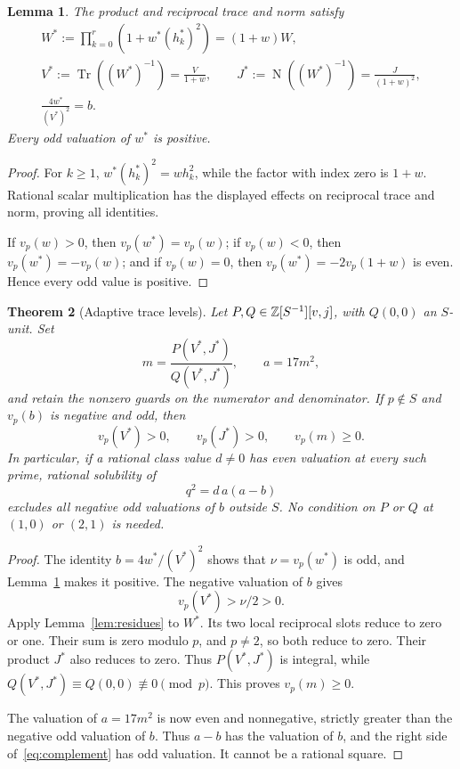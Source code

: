 \documentclass[11pt,a4paper]{article}
\newtheorem{theorem}{Theorem}[section]
\newtheorem{lemma}[theorem]{Lemma}
\theoremstyle{definition}\newtheorem{definition}[theorem]{Definition}
\DeclareMathOperator{\Tr}{Tr}\DeclareMathOperator{\Nm}{N}
\begin{document}
\begin{lemma}\label{lem:exact}
The product and reciprocal trace and norm satisfy
\begin{equation}\label{eq:staridentities}
 \begin{gathered}
 W^*:=\prod_{k=0}^{r}(1+w^*(h_k^*)^2)=(1+w)W,\\
 V^*:=\Tr((W^*)^{-1})=\frac{V}{1+w},\qquad
 J^*:=\Nm((W^*)^{-1})=\frac{J}{(1+w)^2},\\
                         \frac{4w^*}{(V^*)^2}=b.
 \end{gathered}
\end{equation}
Every odd valuation of $w^*$ is positive.
\end{lemma}
\begin{proof}
For $k\ge1$, $w^*(h_k^*)^2=w h_k^2$, while the factor with
index zero is $1+w$. Rational scalar multiplication has the displayed
effects on reciprocal trace and norm, proving all identities.

If $v_p(w)>0$, then $v_p(w^*)=v_p(w)$; if $v_p(w)<0$, then
$v_p(w^*)=-v_p(w)$; and if $v_p(w)=0$, then
$v_p(w^*)=-2v_p(1+w)$ is even. Hence every odd value is positive.
\end{proof}

\begin{theorem}[Adaptive trace levels]\label{thm:adaptive}
Let $P,Q\in\mathbb Z[S^{-1}][v,j]$, with $Q(0,0)$ an $S$-unit. Set
\begin{equation}\label{eq:adaptive}
                     m=\frac{P(V^*,J^*)}{Q(V^*,J^*)},
                     \qquad a=17m^2,
\end{equation}
and retain the nonzero guards on the numerator and denominator.
If $p\notin S$ and $v_p(b)$ is negative and odd, then
\[
                    v_p(V^*)>0,\qquad v_p(J^*)>0,
                    \qquad v_p(m)\ge0.
\]
In particular, if a rational class value $d\ne0$ has even valuation
at every such prime, rational solubility of
\begin{equation}\label{eq:complement}
                         q^2=d\,a(a-b)
\end{equation}
excludes all negative odd valuations of $b$ outside $S$.
No condition on $P$ or $Q$ at $(1,0)$ or $(2,1)$ is needed.
\end{theorem}
\begin{proof}
The identity $b=4w^*/(V^*)^2$ shows that
$\nu=v_p(w^*)$ is odd, and Lemma~\ref{lem:exact} makes it positive.
The negative valuation of $b$ gives
\[
                         v_p(V^*)>\nu/2>0.
\]
Apply Lemma~\ref{lem:residues} to $W^*$. Its two local reciprocal
slots reduce to zero or one. Their sum is zero modulo $p$, and
$p\ne2$, so both reduce to zero. Their product $J^*$ also reduces
to zero. Thus $P(V^*,J^*)$ is integral, while
$Q(V^*,J^*)\equiv Q(0,0)\not\equiv0\pmod p$.
This proves $v_p(m)\ge0$.

The valuation of $a=17m^2$ is now even and nonnegative, strictly
greater than the negative odd valuation of $b$. Thus $a-b$ has
the valuation of $b$, and the right side of~\eqref{eq:complement}
has odd valuation. It cannot be a rational square.
\end{proof}
\end{document}
